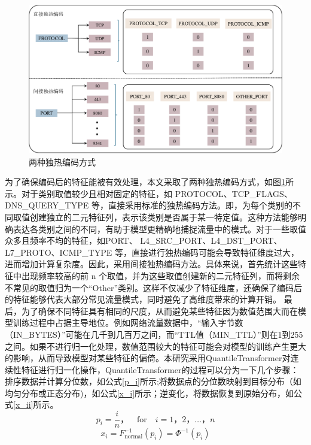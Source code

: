 \documentclass[promaster]{thesis-uestc}
\begin{document}
\begin{figure}[h!]
    \centering
    \includegraphics[width=1\linewidth]{./pic/one hot coding(大字版).pdf}
    \caption{两种独热编码方式}
    \label{oneHotCode}
\end{figure}
为了确保编码后的特征能被有效处理，本文采取了两种独热编码方式，如图\ref{oneHotCode}所示。对于类别取值较少且相对固定的特征，如 PROTOCOL、TCP\_FLAGS、DNS\_QUERY\_TYPE 等，直接采用标准的独热编码方法。即，为每个类别的不同取值创建独立的二元特征列，表示该类别是否属于某一特定值。这种方法能够明确表达各类别之间的不同，有助于模型更精确地捕捉流量中的模式。对于一些取值众多且频率不均的特征，如PORT、 L4\_SRC\_PORT、L4\_DST\_PORT、L7\_PROTO、ICMP\_TYPE 等，直接进行独热编码可能会导致特征维度过大，进而增加计算复杂度。因此，采用间接独热编码方法。具体来说，首先统计这些特征中出现频率较高的前 n 个取值，并为这些取值创建新的二元特征列，而将剩余不常见的取值归为一个“Other”类别。这样不仅减少了特征维度，还确保了编码后的特征能够代表大部分常见流量模式，同时避免了高维度带来的计算开销。
最后，为了确保不同特征具有相同的尺度，从而避免某些特征因为数值范围大而在模型训练过程中占据主导地位。例如网络流量数据中，“输入字节数（IN\_BYTES）”可能在几千到几百万之间，而“TTL值（MIN\_TTL）”则在1到255之间。如果不进行归一化处理，数值范围较大的特征可能会对模型的训练产生更大的影响，从而导致模型对某些特征的偏倚。本研究采用QuantileTransformer对连续性特征进行归一化操作，QuantileTransformer的过程可以分为一下几个步骤：排序数据并计算分位数，如公式\ref{p_i}所示;将数据点的分位数映射到目标分布（如均匀分布或正态分布)，如公式\ref{x_i}所示；逆变化，将数据恢复到原始分布，如公式\ref{x_ii}所示。
\begin{equation}
p_i = \frac{i}{n}， \quad \text{for} \quad i = 1， 2， \dots， n
\label{p_i}
\end{equation}
\begin{equation}
x_i = F_{\text{normal}}^{-1}(p_i) = \Phi^{-1}(p_i)
\label{x_i}
\end{equation}
\end{document}

